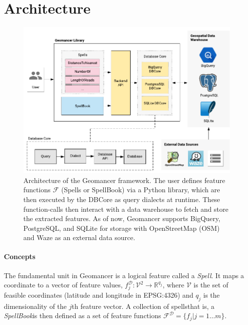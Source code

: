\documentclass{article}
\begin{document}
\section{Architecture}

\begin{figure}
    \begin{center}
        \includegraphics[width=0.85\linewidth]{architecture.pdf}
    \end{center}
  \caption{
    Architecture of the Geomancer framework. The user defines feature functions
    $\mathcal{F}$  (Spells or SpellBook) via a Python library, which are then
    executed by the DBCore as query dialects at runtime. These function-calls
    then interact with a data warehouse to fetch and store the extracted
    features. As of now, Geomancer supports BigQuery, PostgreSQL, and SQLite
    for storage with OpenStreetMap (OSM) and Waze as an external data source. 
    }

  \label{fig:architecture}
\end{figure}

\paragraph{Concepts}
The fundamental unit in Geomancer is a logical feature \cite{smith2017ballet}
called a \textit{Spell}. It maps a coordinate to a vector of feature values,
$f_{j}^{\mathcal{D}} : \mathcal{V}^{2} \rightarrow \mathbb{R}^{q_j}$, where
$\mathcal{V}$ is the set of feasible coordinates (latitude and longitude in
EPSG:4326) and $q_{j}$ is the dimensionality of the $j$th feature vector. A
collection of spells\textemdash that is, a \textit{SpellBook}\textemdash is
then defined as a set of feature functions $\mathcal{F}^{\mathcal{D}} = \{f_j
\vert j = 1 \dots m\}$. 
\end{document}
